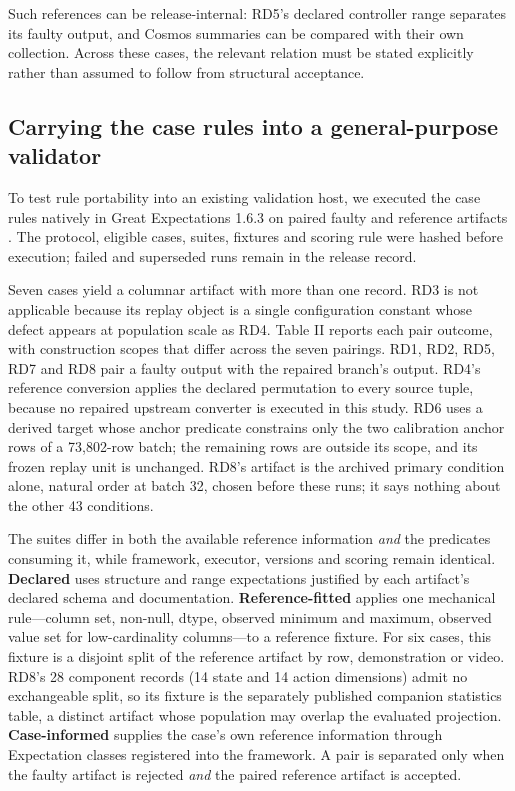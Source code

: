 \documentclass[conference]{IEEEtran}
\begin{document}
Such references can be release-internal: RD5's declared controller range separates its faulty output, and Cosmos summaries can be compared with their own collection. Across these cases, the relevant relation must be stated explicitly rather than assumed to follow from structural acceptance.\par

\subsection{Carrying the case rules into a general-purpose validator}

To test rule portability into an existing validation host, we executed the case rules natively in Great Expectations 1.6.3 on paired faulty and reference artifacts \cite{18}. The protocol, eligible cases, suites, fixtures and scoring rule were hashed before execution; failed and superseded runs remain in the release record.\par



Seven cases yield a columnar artifact with more than one record. RD3 is not applicable because its replay object is a single configuration constant whose defect appears at population scale as RD4. Table II reports each pair outcome, with construction scopes that differ across the seven pairings. RD1, RD2, RD5, RD7 and RD8 pair a faulty output with the repaired branch's output. RD4's reference conversion applies the declared permutation to every source tuple, because no repaired upstream converter is executed in this study. RD6 uses a derived target whose anchor predicate constrains only the two calibration anchor rows of a 73,802-row batch; the remaining rows are outside its scope, and its frozen replay unit is unchanged. RD8's artifact is the archived primary condition alone, natural order at batch 32, chosen before these runs; it says nothing about the other 43 conditions.\par

The suites differ in both the available reference information \textit{and} the predicates consuming it, while framework, executor, versions and scoring remain identical. \textbf{Declared} uses structure and range expectations justified by each artifact's declared schema and documentation. \textbf{Reference-fitted} applies one mechanical rule---column set, non-null, dtype, observed minimum and maximum, observed value set for low-cardinality columns---to a reference fixture. For six cases, this fixture is a disjoint split of the reference artifact by row, demonstration or video. RD8's 28 component records (14 state and 14 action dimensions) admit no exchangeable split, so its fixture is the separately published companion statistics table, a distinct artifact whose population may overlap the evaluated projection. \textbf{Case-informed} supplies the case's own reference information through Expectation classes registered into the framework. A pair is separated only when the faulty artifact is rejected \textit{and} the paired reference artifact is accepted.\par
\end{document}
